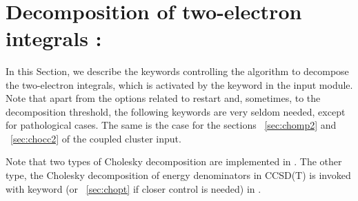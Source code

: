 ~%
\section{Decomposition of two-electron integrals : }\label{sec:choles}
%
%
%

In this Section, we describe the keywords controlling the algorithm to 
decompose the two-electron integrals, which is activated by the 
keyword  in the  input module.
Note that apart from
the options related to restart and, sometimes, to the decomposition
threshold, the following keywords are very seldom needed,
except for pathological cases. The same is the case for the sections
~\ref{sec:chomp2} and ~\ref{sec:chocc2} 
of the coupled cluster input.

Note that two types of Cholesky decomposition are implemented in \dalton.
The other type, the Cholesky decomposition of energy denominators in CCSD(T)  is
invoked with keyword  (or ~\ref{sec:chopt} if 
closer control is needed) in .


\begin{center}
\end{center}

